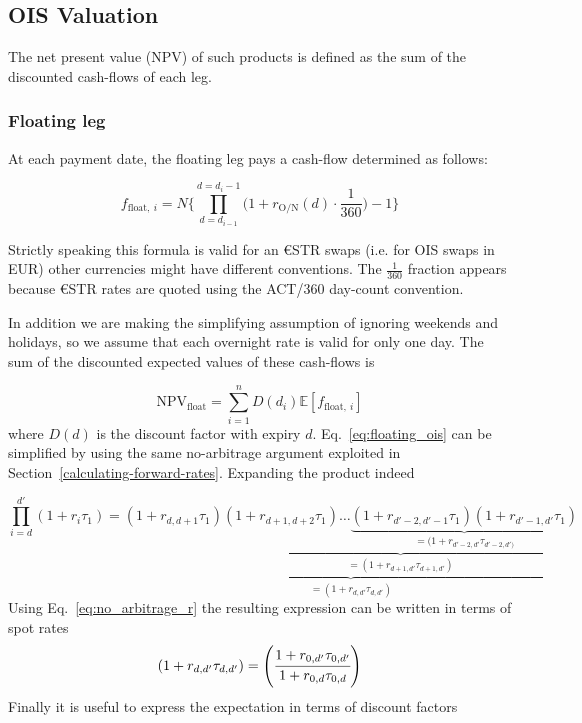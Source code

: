 \subsection{OIS Valuation}\label{ois-valuation}
The net present value (NPV) of such products is defined as the sum of the discounted cash-flows of each leg.

\subsubsection{Floating leg}\label{floating-leg}
At each payment date, the floating leg pays a cash-flow determined as follows:

\begin{equation}
f_{\mathrm{float},~i} = N \Bigg\{\prod_{d=d_{i-1}}^{d=d_i-1}\Big(1+r_{\mathrm{O/N}}(d)\cdot\frac{1}{360}\Big) -1 \Bigg\}
\label{eq:floating_ois}
\end{equation}

Strictly speaking this formula is valid for an \euro STR swaps (i.e. for OIS swaps in EUR) other currencies might have different conventions. The $\frac{1}{360}$ fraction appears because \euro STR rates are quoted using the ACT/360 day-count convention. 

In addition we are making the simplifying assumption of ignoring weekends and holidays, so we assume that each overnight rate is valid for only one day. The sum of the discounted expected values of these cash-flows is

\begin{equation}
\mathrm{NPV}_{\mathrm{float}} = \sum_{i=1}^{n}D(d_i)\mathbb{E}[f_{\mathrm{float},~i}]
\end{equation}
where $D(d)$ is the discount factor with expiry $d$. Eq.~\ref{eq:floating_ois} can be simplified by using the same no-arbitrage argument exploited in Section~\ref{calculating-forward-rates}. Expanding the product indeed

\begin{equation*}
\prod_{i=d}^{d'} (1+r_i\tau_1) = \underbrace{(1+r_{d,d+1}\tau_1)\underbrace{(1+r_{d+1,d+2}\tau_1)\ldots\underbrace{(1+r_{d'-2,d'-1}\tau_1)(1+r_{d'-1,d'}\tau_1)}_{\textstyle =(1+r_{d'-2,d'}\tau_{d'-2,d')}}}_{\textstyle =(1+r_{d+1,d'}\tau_{d+1, d'})}}_{\textstyle =(1+r_{d,d'}\tau_{d,d'})}
\end{equation*}
\noindent
Using Eq.~\ref{eq:no_arbitrage_r} the resulting expression can be written in terms of spot rates
\begin{equation*}
(1+r_{d,d'}\tau_{d,d'}) = \left(\cfrac{1+r_{0, d'}\tau_{0,d'}}{1+r_{0,d}\tau_{0,d}}\right)
\end{equation*}
\noindent Finally it is useful to express the expectation in terms of discount factors


